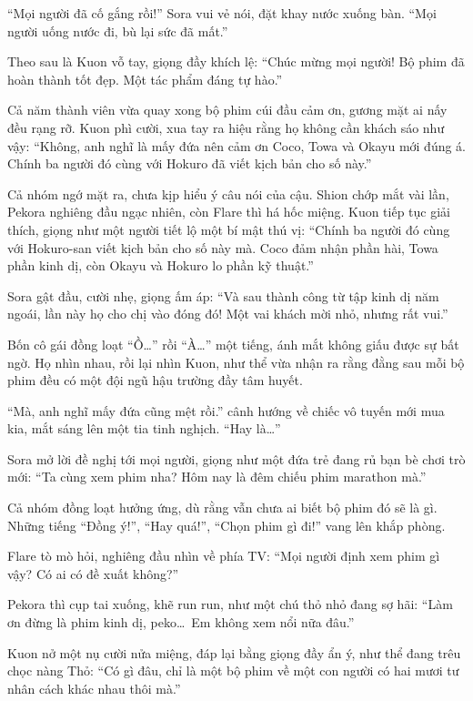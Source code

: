 \documentclass[../main.tex]{subfiles}
\begin{document}
``Mọi người đã cố gắng rồi!'' Sora vui vẻ nói, đặt khay nước xuống bàn. ``Mọi người uống nước đi, bù lại sức đã mất.''

Theo sau là Kuon vỗ tay, giọng đầy khích lệ: ``Chúc mừng mọi người! Bộ phim đã hoàn thành tốt đẹp. Một tác phẩm đáng tự hào.''

Cả năm thành viên vừa quay xong bộ phim cúi đầu cảm ơn, gương mặt ai nấy đều rạng rỡ. Kuon phì cười, xua tay ra hiệu rằng họ không cần khách sáo như vậy: ``Không, anh nghĩ là mấy đứa nên cảm ơn Coco, Towa và Okayu mới đúng á. Chính ba người đó cùng với Hokuro đã viết kịch bản cho số này.''

Cả nhóm ngớ mặt ra, chưa kịp hiểu ý câu nói của cậu. Shion chớp mắt vài lần, Pekora nghiêng đầu ngạc nhiên, còn Flare thì há hốc miệng. Kuon tiếp tục giải thích, giọng như một người tiết lộ một bí mật thú vị: ``Chính ba người đó cùng với Hokuro-san viết kịch bản cho số này mà. Coco đảm nhận phần hài, Towa phần kinh dị, còn Okayu và Hokuro lo phần kỹ thuật.''

Sora gật đầu, cười nhẹ, giọng ấm áp: ``Và sau thành công từ tập kinh dị năm ngoái, lần này họ cho chị vào đóng đó! Một vai khách mời nhỏ, nhưng rất vui.''

Bốn cô gái đồng loạt ``Ồ\dots'' rồi ``À\dots'' một tiếng, ánh mắt không giấu được sự bất ngờ. Họ nhìn nhau, rồi lại nhìn Kuon, như thể vừa nhận ra rằng đằng sau mỗi bộ phim đều có một đội ngũ hậu trường đầy tâm huyết.

``Mà, anh nghĩ mấy đứa cũng mệt rồi.'' cânh hướng về chiếc vô tuyến mới mua kia, mắt sáng lên một tia tinh nghịch. ``Hay là\dots''

Sora mở lời đề nghị tới mọi người, giọng như một đứa trẻ đang rủ bạn bè chơi trò mới: ``Ta cùng xem phim nha? Hôm nay là đêm chiếu phim marathon mà.''

Cả nhóm đồng loạt hưởng ứng, dù rằng vẫn chưa ai biết bộ phim đó sẽ là gì. Những tiếng ``Đồng ý!'', ``Hay quá!'', ``Chọn phim gì đi!'' vang lên khắp phòng.

Flare tò mò hỏi, nghiêng đầu nhìn về phía TV: ``Mọi người định xem phim gì vậy? Có ai có đề xuất không?''

Pekora thì cụp tai xuống, khẽ run run, như một chú thỏ nhỏ đang sợ hãi: ``Làm ơn đừng là phim kinh dị, peko\dots\ Em không xem nổi nữa đâu.''

Kuon nở một nụ cười nửa miệng, đáp lại bằng giọng đầy ẩn ý, như thể đang trêu chọc nàng Thỏ: ``Có gì đâu, chỉ là một bộ phim về một con người có hai mươi tư nhân cách khác nhau thôi mà.''
\end{document}
